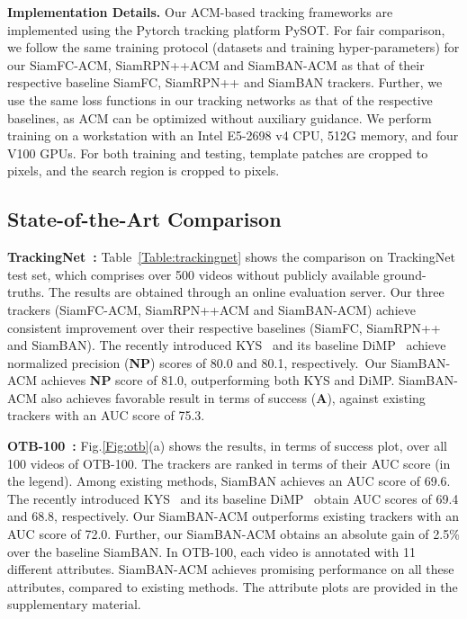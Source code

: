 \documentclass[10pt,twocolumn,letterpaper,final]{cvpr}
\begin{document}
\noindent\textbf{{Implementation Details.}} 
Our ACM-based tracking frameworks are implemented using the Pytorch tracking platform PySOT. For fair comparison, we follow the same training protocol (datasets and training hyper-parameters) for our SiamFC-ACM, SiamRPN++ACM and SiamBAN-ACM as that of their respective baseline SiamFC, SiamRPN++ and SiamBAN trackers. Further, we use the same loss functions in our tracking networks as that of the respective baselines, as ACM can be optimized without auxiliary guidance. We perform training on a workstation with an Intel E5-2698 v4 CPU, 512G memory, and four V100 GPUs. For both training and testing, template patches are cropped to  pixels, and the search region is cropped to  pixels.




























\subsection{ State-of-the-Art Comparison}
\noindent\textbf{TrackingNet~\cite{muller2018trackingnet}:} Table~\ref{Table:trackingnet} shows the comparison on TrackingNet test set, which comprises over 500 videos without publicly available
ground-truths. The results are obtained through an online evaluation server. Our three trackers (SiamFC-ACM, SiamRPN++ACM and SiamBAN-ACM) achieve consistent improvement over their respective baselines (SiamFC, SiamRPN++ and SiamBAN). The recently introduced KYS~\cite{bhat2020know} and its baseline DiMP~\cite{bhat2019learning} achieve normalized precision (\textbf{NP}) scores of 80.0 and 80.1, respectively.~Our SiamBAN-ACM achieves \textbf{NP} score of 81.0, outperforming both KYS and DiMP. SiamBAN-ACM also achieves favorable result in terms of success (\textbf{A}), against existing trackers with an AUC score of 75.3.


\noindent\textbf{OTB-100~\cite{wu2015object}:}  Fig.\ref{Fig:otb}(a) shows the results, in terms of success plot, over all 100 videos of OTB-100. The trackers are ranked in terms of their AUC score (in the legend).
Among existing methods, SiamBAN achieves an AUC score of 69.6. The recently introduced KYS~\cite{bhat2020know} and its baseline DiMP~\cite{bhat2019learning} obtain AUC scores of 69.4 and 68.8, respectively. Our SiamBAN-ACM outperforms existing trackers with an AUC score of 72.0. Further, our SiamBAN-ACM obtains an absolute gain of 2.5\% over the baseline SiamBAN. In OTB-100, each video is annotated with 11
different attributes. SiamBAN-ACM achieves promising performance on all these attributes, compared to existing methods. The attribute plots are provided in the supplementary material. 
\end{document}
